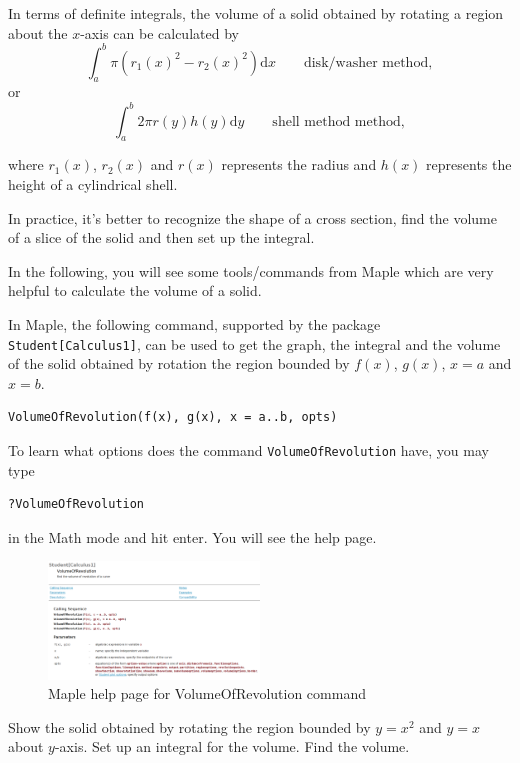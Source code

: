 \documentclass[en,11pt,simple]{elegantbook}
\let\BeginKnitrBlock\begin \let\EndKnitrBlock\end
\begin{document}
In terms of definite integrals, the volume of a solid obtained by rotating a region about the \(x\)-axis can be calculated by
\[\int_a^b \pi (r_1(x)^2 - r_2(x)^2) \mathrm{d} x \qquad \text{disk/washer method},\]
or
\[\int_a^b 2\pi r(y) h(y) \mathrm{d} y \qquad \text{shell method method},\]

where \(r_1(x)\), \(r_2(x)\) and \(r(x)\) represents the radius and \(h(x)\) represents the height of a cylindrical shell.

In practice, it's better to recognize the shape of a cross section, find the volume of a slice of the solid and then set up the integral.

In the following, you will see some tools/commands from Maple which are very helpful to calculate the volume of a solid.

In Maple, the following command, supported by the package \texttt{Student{[}Calculus1{]}}, can be used to get the graph, the integral and the volume of the solid obtained by rotation the region bounded by \(f(x)\), \(g(x)\), \(x=a\) and \(x=b\).

\begin{verbatim}
VolumeOfRevolution(f(x), g(x), x = a..b, opts)
\end{verbatim}

To learn what options does the command \texttt{VolumeOfRevolution} have, you may type

\begin{verbatim}
?VolumeOfRevolution
\end{verbatim}

in the Math mode and hit enter. You will see the help page.

\begin{figure}
\centering
\includegraphics[width=0.5\textwidth,height=\textheight]{figs/VolOfRev-help-page.png}
\caption{Maple help page for VolumeOfRevolution command}
\end{figure}

\BeginKnitrBlock{example}{}{}
\protect\hypertarget{exm:unnamed-chunk-159}{}{\label{exm:unnamed-chunk-159} }Show the solid obtained by rotating the region bounded by \(y=x^2\) and \(y=x\) about \(y\)-axis. Set up an integral for the volume. Find the volume.
\EndKnitrBlock{example}
\end{document}

